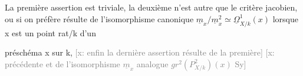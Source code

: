 \documentclass[11pt]{article}
\newcommand{\scanpage}[1]{\par\bigskip\noindent{\small\sffamily[scan #1]}\par}
\newcommand{\mspage}[1]{{\small\sffamily[p.\,#1]}}
\newcommand{\hand}[1]{\textcolor{blue}{#1}}
\newcommand{\xout}[1]{\textcolor{gray}{[\textsf{x:} #1]}}
\begin{document}
La première assertion est triviale, la deuxième n'est autre
que le critère jacobien, ou si on préfère résulte de l'isomorphisme
canonique $\underline{m}_x/\underline{m}_x^2 \simeq \underline{\Omega}^1_{X/k}(x)$ lorsque x est un point rat/k d'un

\mspage{\hand{141}}

\clearpage
\scanpage{25/142}
\mspage{\hand{3}}

préschéma x sur k, \xout{enfin la dernière assertion résulte de la première}
\xout{précédente et de l'isomorphisme $\underline{m}_x$ analogue $gr^2(P^2_{X/k})(x)$ Sy}
\end{document}

